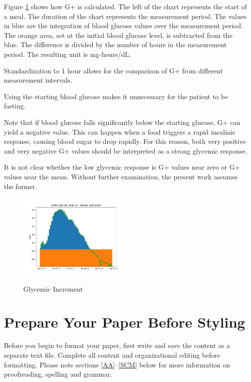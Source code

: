 \documentclass[conference]{IEEEtran}
\begin{document}
Figure \ref{fig:gplus_illustrated} shows how G+ is calculated. The left of the chart represents the start of a meal. The duration of the chart represents the measurement period. The values in blue are the integration of blood glucose values over the measurement period. The orange area, set at the initial blood glucose level, is subtracted from the blue. The difference is divided by the number of hours in the measurement period. The resulting unit is mg-hours/dL.

Standardization to 1 hour allows for the comparison of G+ from different measurement intervals.

Using the starting blood glucose makes it unnecessary for the patient to be fasting.

Note that if blood glucose falls significantly below the starting glucose, G+ can yield a negative value. This can happen when a food triggers a rapid insulinic response, causing blood sugar to drop rapidly. For this reason, both very positive and very negative G+ values should be interpreted as a strong glycemic response.

It is not clear whether the low glycemic response is G+ values near zero or G+ values near the mean. Without further examination, the present work assumes the former.

\begin{figure}[h]
    \includegraphics[width=0.5\textwidth]{images/gplus_illustrated.png}
    \label{fig:gplus_illustrated}
    \caption{Glycemic Increment}
\end{figure}

\section{Prepare Your Paper Before Styling}
Before you begin to format your paper, first write and save the content as a 
separate text file. Complete all content and organizational editing before 
formatting. Please note sections \ref{AA}--\ref{SCM} below for more information on 
proofreading, spelling and grammar.
\end{document}
